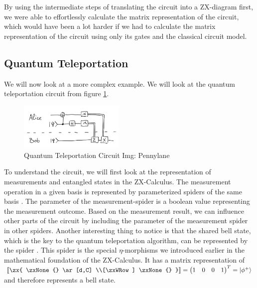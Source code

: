 By using the intermediate steps of translating the circuit into a ZX-diagram first, we were able to effortlessly calculate the matrix representation of the circuit, which would have been a lot harder if we had to calculate the matrix representation of the circuit using only its gates and the classical circuit model.

\subsection{Quantum Teleportation}

We will now look at a more complex example. We will look at the quantum teleportation circuit from figure \ref{fig:teleportation-classic}.

\begin{figure}[h]
    \centering
    \includegraphics[width=0.45\textwidth]{images/teleportation-classic.png}
    \caption{Quantum Teleportation Circuit Img: Pennylane\cite{pennylane2023zx}}
    \label{fig:teleportation-classic}
\end{figure}

To understand the circuit, we will first look at the representation of measurements and entangled states in the ZX-Calculus.
The measurement operation in a given basis is represented by parameterized spiders of the same basis \cite{vandewetering2020zxcalculus}. The parameter of the measurement-spider is a boolean value representing the measurement outcome. Based on the measurement result, we can influence other parts of the circuit by including the parameter of the measurement spider in other spiders.
Another interesting thing to notice is that the shared bell state, which is the key to the quantum teleportation algorithm, can be represented by the spider
\zx{
    \zxNone{} \ar[d,C] \\[\zxWRow] \zxNone{}
}. This spider is the special $\eta$-morphisms we introduced earlier in the mathematical foundation of the ZX-Calculus. It has a matrix representation of
$
    \left \llbracket
    \zx{
        \zxNone{} \ar[d,C] \\[\zxWRow] \zxNone{}
    }
    \right \rrbracket =
    \begin{pmatrix}
        1 & 0 & 0 & 1 \\
    \end{pmatrix}^T = |\phi^+\rangle
$ and therefore represents a bell state.

